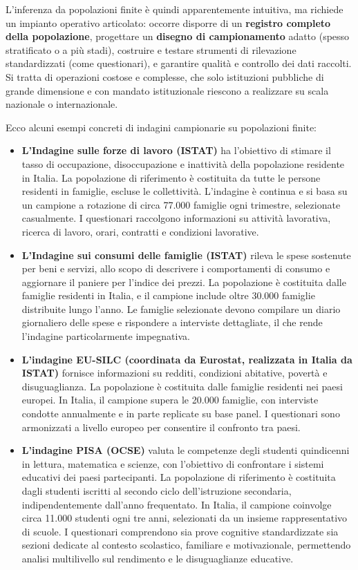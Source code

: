 \documentclass[
  11pt,
]{book}
\theoremstyle{mytheoremstyle}
\theoremstyle{mydefstyle}
\begin{document}
L'inferenza da popolazioni finite è quindi apparentemente intuitiva, ma richiede un impianto operativo articolato: occorre disporre di un \textbf{registro completo della popolazione}, progettare un \textbf{disegno di campionamento} adatto (spesso stratificato o a più stadi), costruire e testare strumenti di rilevazione standardizzati (come questionari), e garantire qualità e controllo dei dati raccolti. Si tratta di operazioni costose e complesse, che solo istituzioni pubbliche di grande dimensione e con mandato istituzionale riescono a realizzare su scala nazionale o internazionale.

Ecco alcuni esempi concreti di indagini campionarie su popolazioni finite:

\begin{itemize}
\item
  \textbf{L'Indagine sulle forze di lavoro (ISTAT)} ha l'obiettivo di stimare il tasso di occupazione, disoccupazione e inattività della popolazione residente in Italia. La popolazione di riferimento è costituita da tutte le persone residenti in famiglie, escluse le collettività. L'indagine è continua e si basa su un campione a rotazione di circa 77.000 famiglie ogni trimestre, selezionate casualmente. I questionari raccolgono informazioni su attività lavorativa, ricerca di lavoro, orari, contratti e condizioni lavorative.
\item
  \textbf{L'Indagine sui consumi delle famiglie (ISTAT)} rileva le spese sostenute per beni e servizi, allo scopo di descrivere i comportamenti di consumo e aggiornare il paniere per l'indice dei prezzi. La popolazione è costituita dalle famiglie residenti in Italia, e il campione include oltre 30.000 famiglie distribuite lungo l'anno. Le famiglie selezionate devono compilare un diario giornaliero delle spese e rispondere a interviste dettagliate, il che rende l'indagine particolarmente impegnativa.
\item
  \textbf{L'indagine EU-SILC (coordinata da Eurostat, realizzata in Italia da ISTAT)} fornisce informazioni su redditi, condizioni abitative, povertà e disuguaglianza. La popolazione è costituita dalle famiglie residenti nei paesi europei. In Italia, il campione supera le 20.000 famiglie, con interviste condotte annualmente e in parte replicate su base panel. I questionari sono armonizzati a livello europeo per consentire il confronto tra paesi.
\item
  \textbf{L'indagine PISA (OCSE)} valuta le competenze degli studenti quindicenni in lettura, matematica e scienze, con l'obiettivo di confrontare i sistemi educativi dei paesi partecipanti. La popolazione di riferimento è costituita dagli studenti iscritti al secondo ciclo dell'istruzione secondaria, indipendentemente dall'anno frequentato. In Italia, il campione coinvolge circa 11.000 studenti ogni tre anni, selezionati da un insieme rappresentativo di scuole. I questionari comprendono sia prove cognitive standardizzate sia sezioni dedicate al contesto scolastico, familiare e motivazionale, permettendo analisi multilivello sul rendimento e le disuguaglianze educative.

\end{itemize}
\end{document}
